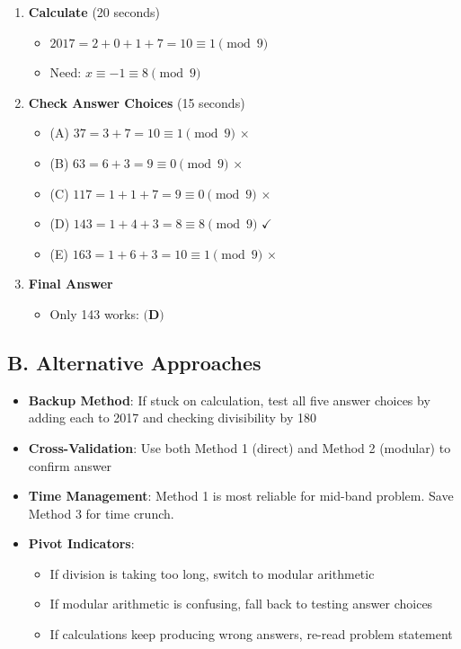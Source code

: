 \documentclass[]{article}
\begin{document}
\begin{solutionbox}
\begin{enumerate}[leftmargin=*]
    \item \textbf{Calculate} (20 seconds)
    \begin{itemize}
        \item $2017 = 2 + 0 + 1 + 7 = 10 \equiv 1 \pmod{9}$
        \item Need: $x \equiv -1 \equiv 8 \pmod{9}$
    \end{itemize}
    
    \item \textbf{Check Answer Choices} (15 seconds)
    \begin{itemize}
        \item (A) $37 = 3 + 7 = 10 \equiv 1 \pmod{9}$ $\times$
        \item (B) $63 = 6 + 3 = 9 \equiv 0 \pmod{9}$ $\times$
        \item (C) $117 = 1 + 1 + 7 = 9 \equiv 0 \pmod{9}$ $\times$
        \item (D) $143 = 1 + 4 + 3 = 8 \equiv 8 \pmod{9}$ $\checkmark$
        \item (E) $163 = 1 + 6 + 3 = 10 \equiv 1 \pmod{9}$ $\times$
    \end{itemize}
    
    \item \textbf{Final Answer}
    \begin{itemize}
        \item Only 143 works: $\boxed{\textbf{(D)}}$
    \end{itemize}
\end{enumerate}

\subsection*{B. Alternative Approaches}
\begin{itemize}[leftmargin=*]
    \item \textbf{Backup Method}: If stuck on calculation, test all five answer choices by adding each to 2017 and checking divisibility by 180
    
    \item \textbf{Cross-Validation}: Use both Method 1 (direct) and Method 2 (modular) to confirm answer
    
    \item \textbf{Time Management}: Method 1 is most reliable for mid-band problem. Save Method 3 for time crunch.
    
    \item \textbf{Pivot Indicators}: 
    \begin{itemize}
        \item If division is taking too long, switch to modular arithmetic
        \item If modular arithmetic is confusing, fall back to testing answer choices
        \item If calculations keep producing wrong answers, re-read problem statement
    \end{itemize}
\end{itemize}
\end{solutionbox}
\end{document}
